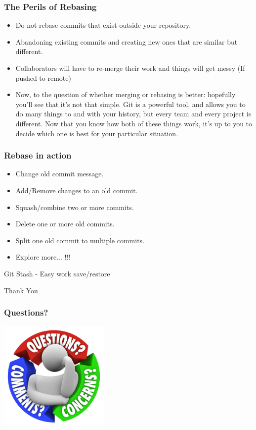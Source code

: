 \documentclass[10pt]{beamer}
\begin{document}
\begin{frame}
  \frametitle{The Perils of Rebasing}
  \begin{itemize}
    \item Do not rebase commits that \alert<4>{exist outside your repository}.
    \pause
    \item Abandoning existing commits and \alert<4>{creating new ones that are similar but different}.
    \pause
    \item Collaborators will have to \alert<4>{re-merge their work} and things will get messy (If pushed to remote)
    \pause
    \item Now, to the question of whether merging or rebasing is better: hopefully you’ll see that it’s not that simple. Git is a powerful tool, and allows you to do many things to and with your history, but every team and every project is different. Now that you know how both of these things work, it’s up to you to decide which
 one is best for your particular situation.
  \end{itemize}
\end{frame}

\begin{frame}
  \frametitle{Rebase in action}
  \begin{itemize}
    \item Change old commit message.
    \pause
    \item Add/Remove changes to an old commit.
    \pause
    \item Squash/combine two or more commits.
    \pause
    \item Delete one or more old commits.
    \pause
    \item Split one old commit to multiple commits.
    \pause
    \item \alert{Explore more... !!!}
  \end{itemize}
\end{frame}

\begin{frame}
  \begin{center}
    \Huge{Git Stash - Easy work save/restore }
  \end{center}
\end{frame}

\begin{frame}
  \begin{center}
    \Huge{Thank You}
  \end{center}
\end{frame}

\begin{frame}
	\frametitle{Questions?}
	\begin{center}
	  \includegraphics[width=0.40\textwidth]{q5.jpg}
	\end{center}
\end{frame}

\end{document}
